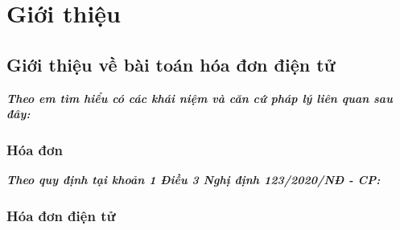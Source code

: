\documentclass{article} %
\begin{document}


% 

% 

% 

% 

% 



% 

% 

% 

% 

% 

% 

% 

% 

% 


\section{Giới thiệu}



\subsection{Giới thiệu về bài toán hóa đơn điện tử}



\textbf{\textit{Theo em tìm hiểu có các khái niệm và căn cứ pháp lý liên quan sau đây:}}

\subsubsection{Hóa đơn}

\textbf{\textit{Theo quy định tại khoản 1 Điều 3 Nghị định 123/2020/NĐ - CP:}}



\subsubsection{Hóa đơn điện tử}
\end{document}
